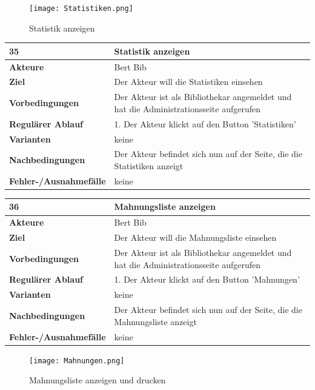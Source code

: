 \documentclass[fontsize=12pt,paper=a4,twoside]{scrartcl}
\begin{document}
\begin{figure}
	[H] \caption{Statistik anzeigen} 
	\texttt{[image: Statistiken.png]} \label{pic:Statistik} 
\end{figure}
\begin{table}
	[H] \label{35} 
	\begin{tabular}
		{|l|p{10cm}|} \hline \textbf{35} & \textbf{Statistik anzeigen} \\
		\hline \textbf{Akteure} & Bert Bib\\
		\hline \textbf{Ziel} & Der Akteur will die Statistiken einsehen \\
		\hline \textbf{Vorbedingungen} & Der Akteur ist als Bibliothekar angemeldet und hat die Administrationsseite aufgerufen \\
		\hline \textbf{Regulärer Ablauf} & 1. Der Akteur klickt auf den Button 'Statistiken' \\
		\hline \textbf{Varianten} & keine \\
		\hline \textbf{Nachbedingungen} & Der Akteur befindet sich nun auf der Seite, die die Statistiken anzeigt\\
		\hline \textbf{Fehler-/Ausnahmefälle} & keine\\
		\hline 
	\end{tabular}
\end{table}
\begin{table}
	[H] \label{36} 
	\begin{tabular}
		{|l|p{10cm}|} \hline \textbf{36} & \textbf{Mahnungsliste anzeigen} \\
		\hline \textbf{Akteure} & Bert Bib\\
		\hline \textbf{Ziel} & Der Akteur will die Mahnungsliste einsehen \\
		\hline \textbf{Vorbedingungen} & Der Akteur ist als Bibliothekar angemeldet und hat die Administrationsseite aufgerufen \\
		\hline \textbf{Regulärer Ablauf} & 1. Der Akteur klickt auf den Button 'Mahnungen' \\
		\hline \textbf{Varianten} & keine \\
		\hline \textbf{Nachbedingungen} & Der Akteur befindet sich nun auf der Seite, die die Mahnungsliste anzeigt\\
		\hline \textbf{Fehler-/Ausnahmefälle} & keine\\
		\hline 
	\end{tabular}
\end{table}
\begin{figure}
	[H] \caption{Mahnungsliste anzeigen und drucken} 
	\texttt{[image: Mahnungen.png]} \label{pic:MahnungslisteDrucken} 
\end{figure}
\end{document}
